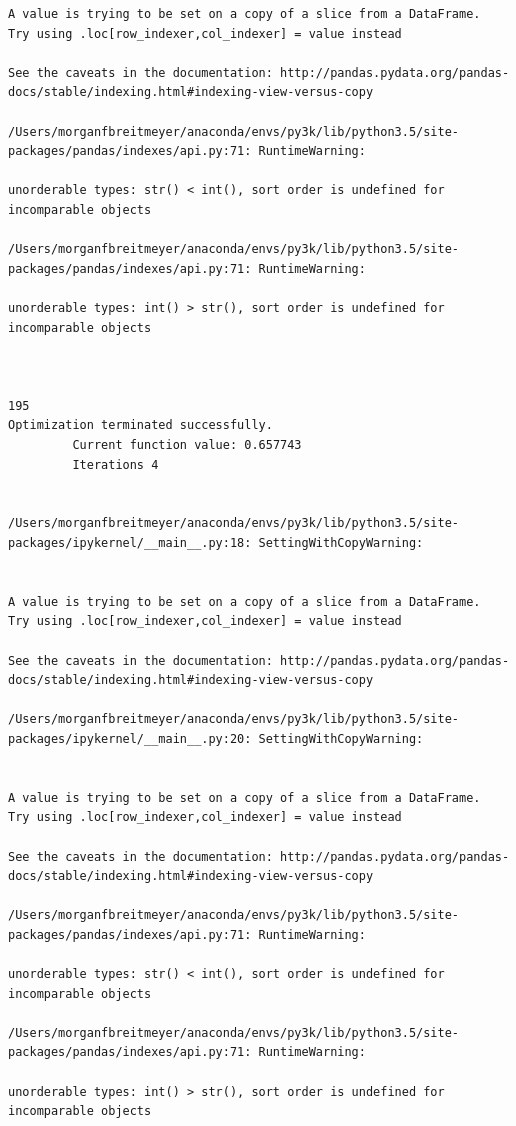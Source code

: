 \begin{lstlisting}
A value is trying to be set on a copy of a slice from a DataFrame.
Try using .loc[row_indexer,col_indexer] = value instead

See the caveats in the documentation: http://pandas.pydata.org/pandas-docs/stable/indexing.html#indexing-view-versus-copy

/Users/morganfbreitmeyer/anaconda/envs/py3k/lib/python3.5/site-packages/pandas/indexes/api.py:71: RuntimeWarning:

unorderable types: str() < int(), sort order is undefined for incomparable objects

/Users/morganfbreitmeyer/anaconda/envs/py3k/lib/python3.5/site-packages/pandas/indexes/api.py:71: RuntimeWarning:

unorderable types: int() > str(), sort order is undefined for incomparable objects



195
Optimization terminated successfully.
         Current function value: 0.657743
         Iterations 4


/Users/morganfbreitmeyer/anaconda/envs/py3k/lib/python3.5/site-packages/ipykernel/__main__.py:18: SettingWithCopyWarning:


A value is trying to be set on a copy of a slice from a DataFrame.
Try using .loc[row_indexer,col_indexer] = value instead

See the caveats in the documentation: http://pandas.pydata.org/pandas-docs/stable/indexing.html#indexing-view-versus-copy

/Users/morganfbreitmeyer/anaconda/envs/py3k/lib/python3.5/site-packages/ipykernel/__main__.py:20: SettingWithCopyWarning:


A value is trying to be set on a copy of a slice from a DataFrame.
Try using .loc[row_indexer,col_indexer] = value instead

See the caveats in the documentation: http://pandas.pydata.org/pandas-docs/stable/indexing.html#indexing-view-versus-copy

/Users/morganfbreitmeyer/anaconda/envs/py3k/lib/python3.5/site-packages/pandas/indexes/api.py:71: RuntimeWarning:

unorderable types: str() < int(), sort order is undefined for incomparable objects

/Users/morganfbreitmeyer/anaconda/envs/py3k/lib/python3.5/site-packages/pandas/indexes/api.py:71: RuntimeWarning:

unorderable types: int() > str(), sort order is undefined for incomparable objects




\end{lstlisting}
